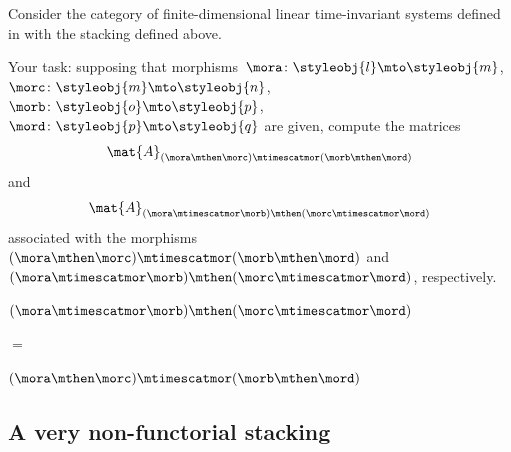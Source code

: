 \begin{gradedexercise}
    \label{ex:StackingLTI}

    Consider the category of finite-dimensional linear time-invariant systems defined in  with the stacking defined above.

    Your task:
    supposing that morphisms~$\mora\colon \styleobj{l}\mto \styleobj{m}$,~$\morc\colon \styleobj{m}\mto \styleobj{n}$,~$\morb\colon \styleobj{o}\mto \styleobj{p}$,~$\mord\colon \styleobj{p}\mto \styleobj{q}$ are given, compute the matrices
    \begin{equation}
        \mat{A}_{(\mora \mthen \morc)\mtimescatmor (\morb\mthen \mord)}
    \end{equation}
    and
    \begin{equation}
        \mat{A}_{(\mora\mtimescatmor \morb)\mthen (\morc\mtimescatmor \mord)}
    \end{equation}
    associated with the morphisms $(\mora \mthen \morc)\mtimescatmor (\morb\mthen \mord)$ and $(\mora\mtimescatmor \morb)\mthen (\morc\mtimescatmor \mord)$, respectively.
\end{gradedexercise}


\begin{marginfigure}
    \centering
    $(\mora \mtimescatmor \morb )
        \mthen (\morc \mtimescatmor \mord )$

    \vspace{3mm}

    $=$

    \vspace{3mm}
    \vspace{3mm}
    $(\mora \mthen \morc ) \mtimescatmor (\morb \mthen \mord )$

    \caption{Commutation of stacking and composition in a functorial stacking . }
\end{marginfigure}

%

\subsection{A very non-functorial stacking}

